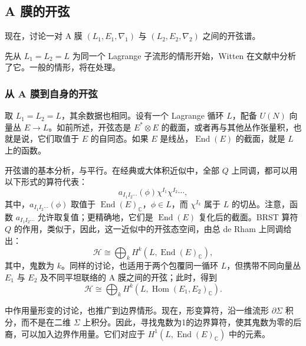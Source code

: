 \subsection{A 膜的开弦}\label{sec:3.6.2}

现在，讨论一对 A 膜 $(L_1,E_1,\nabla_1)$ 与 $(L_2,E_2,\nabla_2)$ 之间的开弦谱。

先从 $L_1=L_2=L$ 为同一个 Lagrange 子流形的情形开始，Witten 在文献中分析了它。一般的情形，将在处理。

\subsubsection{从 A 膜到自身的开弦}\label{sec:3.6.2.1}

取 $L_1=L_2=L$，其余数据也相同。设有一个 Lagrange 循环 $L$，配备 $U(N)$ 向量丛 $E\to L$。如前所述，开弦态是 $E^*\otimes E$ 的截面，或者再与其他丛作张量积，也就是说，它们取值于 $E$ 的自同态。如果 $E$ 是线丛，$\operatorname{End}(E)$ 的截面，就是 $L$ 上的函数。

开弦谱的基本分析，与平行。在经典或大体积近似中，全部 $Q$ 上同调，都可以用以下形式的算符代表：
\begin{equation}\label{eq:3.171}
a_{I_1I_2\cdots}(\phi)\chi^{I_1}\chi^{I_2}\cdots,
\end{equation}
其中，$a_{I_1I_2\cdots}(\phi)$ 取值于 $\operatorname{End}(E)_{\mathbb{C}}$，$\phi\in L$，而 $\chi^{I_k}$ 属于 $L$ 的切丛。注意，函数 $a_{I_1I_2\cdots}$ 允许取复值；更精确地，它们是 $\operatorname{End}(E)$ 复化后的截面。BRST 算符 $Q$ 的作用，类似于，因此，这一近似中的开弦态空间，由总 de Rham 上同调给出：
\begin{equation}\label{eq:3.172}
\mathcal{H}\cong\bigoplus_kH^k(L,\operatorname{End}(E)_{\mathbb{C}}),
\end{equation}
其中，鬼数为 $k$。同样的讨论，也适用于两个包覆同一循环 $L$，但携带不同向量丛 $E_1$ 与 $E_2$ 及不同平坦联络的 A 膜之间的开弦；此时，得到
\begin{equation}\label{eq:3.173}
\mathcal{H}\cong\bigoplus_k
H^k(L,\operatorname{Hom}(E_1,E_2)_{\mathbb{C}}).
\end{equation}

中作用量形变的讨论，也推广到边界情形。现在，形变算符，沿一维流形 $\partial\Sigma$ 积分，而不是在二维 $\Sigma$ 上积分。因此，寻找鬼数为1的边界算符，使其鬼数为零的后裔，可以加入边界作用量。它们对应于 $H^1(L,\operatorname{End}(E)_{\mathbb{C}})$ 中的元素。

